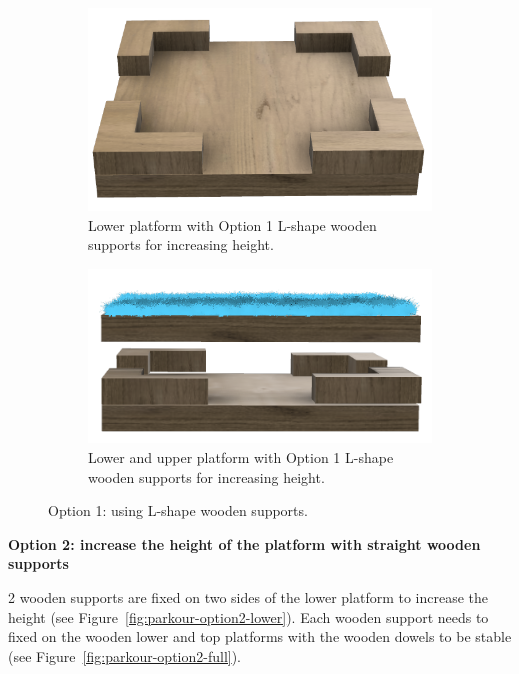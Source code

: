 {\begin{figure}[htb]
  \begin{subfigure}{.45\textwidth}
    \centering
    \includegraphics[width=\textwidth]{img/parkour/option1_lower}
    \caption{Lower platform with Option 1 L-shape wooden supports for increasing
             height.}
    \label{fig:parkour-option1-lower}
  \end{subfigure}
  \hfill
  \begin{subfigure}{.45\textwidth}
    \centering
    \includegraphics[width=\textwidth]{img/parkour/option1_full}
    \caption{Lower and upper platform with Option 1 L-shape wooden supports
             for increasing height.}
    \label{fig:parkour-option1-full}
  \end{subfigure}
  \caption{Option 1: using L-shape wooden supports.}
\end{figure}

\bigskip

{\bfseries Option 2: increase the height of the platform with straight wooden
           supports}

\headlinebox

2 wooden supports are fixed on two sides of the lower platform to increase the
height (see Figure~\ref{fig:parkour-option2-lower}).
Each wooden support needs to fixed on the wooden lower and top platforms with
the wooden dowels to be stable (see Figure~\ref {fig:parkour-option2-full}).

}
